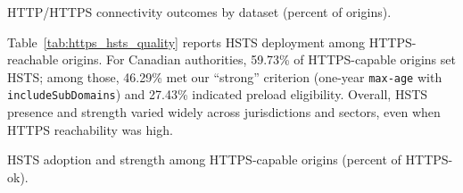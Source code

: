 \documentclass[conference]{IEEEtran}
\begin{document}
  \begin{table}[t]
  \caption{HTTP/HTTPS connectivity outcomes by dataset (percent of origins).}
  \label{tab:https_connectivity}
  \centering
  \scriptsize
  \setlength{\tabcolsep}{3pt}
  \renewcommand{\arraystretch}{1.15}
  
  \begin{adjustbox}{max width=\columnwidth}
  \end{adjustbox}
  \end{table}

Table~\ref{tab:https_hsts_quality} reports HSTS deployment among HTTPS-reachable origins. For Canadian authorities, 59.73\% of HTTPS-capable origins set HSTS; among those, 46.29\% met our ``strong'' criterion (one-year \texttt{max-age} with \texttt{includeSubDomains}) and 27.43\% indicated preload eligibility. 
Overall, HSTS presence and strength varied widely across jurisdictions and sectors, even when HTTPS reachability was high.

\begin{table}[t]
  \caption{HSTS adoption and strength among HTTPS-capable origins (percent of HTTPS-ok).}
  \label{tab:https_hsts_quality}
  \centering
  \scriptsize
  \setlength{\tabcolsep}{3.5pt}
  \renewcommand{\arraystretch}{1.15}

  \begin{adjustbox}{max width=\columnwidth}
  \end{adjustbox}
\end{table} 
\end{document}

